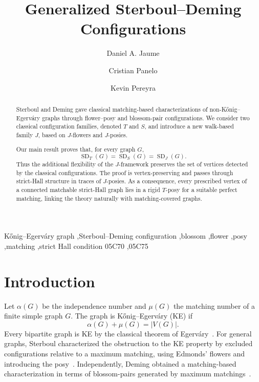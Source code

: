 \documentclass[preprint,12pt]{elsarticle}
\theoremstyle{plain}
\newcommand{\SD}{\operatorname{SD}}
\begin{document}
\begin{frontmatter}

\title{Generalized Sterboul--Deming Configurations}

\author[addr1,addr2]{Daniel A. Jaume}
\author[addr1]{Cristian Panelo}
\author[addr1]{Kevin Pereyra}
\address[addr1]{Departamento de Matem\'{a}tica, Universidad Nacional de San Luis, San Luis, Argentina}
\address[addr2]{Instituto de Matem\'{a}tica Aplicada San Luis, Universidad Nacional de San Luis and CONICET, San Luis, Argentina}

\begin{abstract}
Sterboul and Deming gave classical matching-based characterizations of
non-K\H{o}nig--Egerv\'{a}ry graphs through flower--posy and blossom-pair
configurations. We consider two classical configuration families, denoted
\(T\) and \(S\), and introduce a new walk-based family \(J\), based on
\(J\)-flowers and \(J\)-posies.

Our main result proves that, for every graph \(G\),
\[
\SD_T(G)=\SD_S(G)=\SD_J(G).
\]
Thus the additional flexibility of the \(J\)-framework preserves the set of
vertices detected by the classical configurations. The proof is
vertex-preserving and passes through strict-Hall structure in traces of
\(J\)-posies. As a consequence, every prescribed vertex of a connected
matchable strict-Hall graph lies in a rigid \(T\)-posy for a suitable perfect
matching, linking the theory naturally with matching-covered graphs.
\end{abstract}

\begin{keyword}
K\H{o}nig--Egerv\'{a}ry graph \sep Sterboul--Deming configuration \sep blossom
\sep flower \sep posy \sep matching \sep strict Hall condition
\MSC[2020] 05C70 \sep 05C75
\end{keyword}

\end{frontmatter}

\section{Introduction}\label{sec_introduction}

Let \(\alpha(G)\) be the independence number and \(\mu(G)\) the matching
number of a finite simple graph \(G\). The graph is K\H{o}nig--Egerv\'{a}ry
(KE) if
\[
\alpha(G)+\mu(G)=|V(G)|.
\]
Every bipartite graph is KE by the classical theorem of
Egerv\'{a}ry~\cite{egervary1931combinatorial}. For general graphs, Sterboul
characterized the obstruction to the KE property by excluded configurations
relative to a maximum matching, using Edmonds' flowers and introducing the
posy~\cite{sterboul1979characterization}. Independently, Deming obtained a
matching-based characterization in terms of blossom-pairs generated by
maximum matchings~\cite{deming1979independence}.
\end{document}

